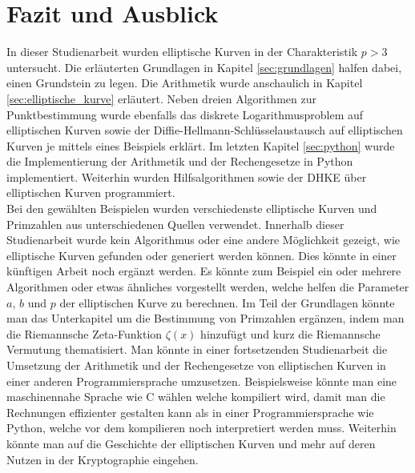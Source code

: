 \chapter{Fazit und Ausblick}
In dieser Studienarbeit wurden elliptische Kurven in der Charakteristik $p > 3$ untersucht. Die erläuterten Grundlagen in Kapitel \ref{sec:grundlagen} halfen dabei, einen Grundstein zu legen. Die Arithmetik wurde anschaulich in Kapitel \ref{sec:elliptische_kurve} erläutert. Neben dreien Algorithmen zur Punktbestimmung wurde ebenfalls das diskrete Logarithmusproblem auf elliptischen Kurven sowie der Diffie-Hellmann-Schlüsselaustausch auf elliptischen Kurven je mittels eines Beispiels erklärt. Im letzten Kapitel \ref{sec:python} wurde die Implementierung der Arithmetik und der Rechengesetze in Python implementiert. Weiterhin wurden Hilfsalgorithmen sowie der DHKE über elliptischen Kurven programmiert.\\

Bei den gewählten Beispielen wurden verschiedenste elliptische Kurven und Primzahlen aus unterschiedenen Quellen verwendet. Innerhalb dieser Studienarbeit wurde kein Algorithmus oder eine andere Möglichkeit gezeigt, wie elliptische Kurven gefunden oder generiert werden können. Dies könnte in einer künftigen Arbeit noch ergänzt werden. Es könnte zum Beispiel ein oder mehrere Algorithmen oder etwas ähnliches vorgestellt werden, welche helfen die Parameter $a$, $b$ und $p$ der elliptischen Kurve zu berechnen. Im Teil der Grundlagen könnte man das Unterkapitel um die Bestimmung von Primzahlen ergänzen, indem man die Riemannsche Zeta-Funktion $\zeta (x)$ hinzufügt und kurz die Riemannsche Vermutung thematisiert. Man könnte in einer fortsetzenden Studienarbeit die Umsetzung der Arithmetik und der Rechengesetze von elliptischen Kurven in einer anderen Programmiersprache umzusetzen. Beispielsweise könnte man eine maschinennahe Sprache wie C wählen welche kompiliert wird, damit man die Rechnungen effizienter gestalten kann als in einer Programmiersprache wie Python, welche vor dem kompilieren noch interpretiert werden muss. Weiterhin könnte man auf die Geschichte der elliptischen Kurven und mehr auf deren Nutzen in der Kryptographie eingehen.